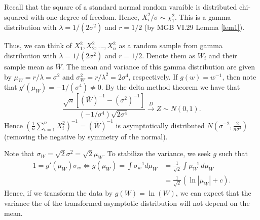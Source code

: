 \documentclass{stat_homework}
\begin{document}
\begin{solution}
Recall that the square of a standard normal random varaible is distributed chi-squared with one degree of freedom.  Hence, $X_i^2/\sigma \sim \chi^2_1$.  This is a gamma distribution with $\lambda = 1/(2\sigma^2)$ and $r= 1/2$ (by MGB VI.29 Lemma \ref{lem1}).  

Thus, we can think of $X_1^2,X_2^2,...,X_n^2$ as a random sample from gamma distribution with $\lambda = 1/(2\sigma^2)$ and $r=1/2$.  Denote them as $W_i$ and their sample mean as $\bar W$.  The mean and variance of this gamma distribution are given by $\mu_W = r/\lambda = \sigma^2$ and $\sigma_W^2= r/\lambda^2 = 2 \sigma^4$, respectively. If $g(w) = w^{-1}$, then note that $g'(\mu_W) = -1/(\sigma^4) \not= 0$.  By the delta method theorem we have that 
$$
  \frac{ \sqrt n \left[(\bar W)^{-1} - (\sigma^2)^{-1}\right]} { \left(-1/\sigma^4\right) \sqrt{2 \sigma^4} } \stackrel{D}{\longrightarrow} Z \sim N(0,1).
$$
Hence $\left(\frac 1n \sum_{i=1}^n X_i^2\right)^{-1} = (\bar W)^{-1}$ is asymptotically distributed $N(\sigma^{-2}, \frac 2{n\sigma^4})$ (removing the negative by symmetry of the normal).  
\end{solution}


\begin{solution}
Note that $\sigma_W = \sqrt 2 \sigma^2 = \sqrt 2 \mu_W$. To stabilize the variance, we seek $g$ such that 
\begin{align*}
  1 = g'(\mu_W) \sigma_w \iff g(\mu_W) = \int \sigma_w^{-1} d\mu_W 
  &= \frac 1{\sqrt 2}\int \mu_W^{-1}\,d\mu_W\\
  &= \frac 1{\sqrt 2}(\ln |\mu_W| + c).
\end{align*}
Hence, if we transform the data by $g(W) = \ln(W)$, we can expect that the variance the of the transformed asymptotic distribution will not depend on the mean. 
\end{solution}
\end{document}
